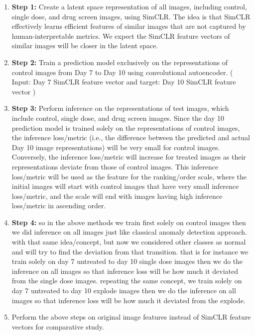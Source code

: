 \begin{enumerate}
    \item \textbf{Step 1:} Create a latent space representation of all images, including control, single dose, 
    and drug screen images, using SimCLR. 
    The idea is that SimCLR effectively learns efficient features of similar images that are not captured by 
    human-interpretable metrics. We expect the SimCLR feature vectors of similar images will be closer in the latent space. 
  
  \item \textbf{Step 2:} Train a prediction model exclusively on the representations of 
  control images from Day 7 to Day 10 using convolutional autoencoder. ( Input: Day 7 SimCLR feature vector and target: Day 10 SimCLR feature vector )

  
  \item \textbf{Step 3:} Perform inference on the representations of test images, which include control, single dose, and drug screen images.
  Since the day 10 prediction model is trained solely on the representations of control images, the inference loss/metric 
  (i.e., the difference between the predicted and actual Day 10 image representations) will be very small for control images.
   Conversely, the inference loss/metric will increase for treated images as their representations deviate from those of control images.
  This inference loss/metric will be used as the feature for the ranking/order scale, where the initial images will start 
  with control images that have very small inference loss/metric, and the scale will end with images having high inference loss/metric in ascending order. 
  
  \item \textbf{Step 4:} so in the above methods we train first solely on control images then we did inference on all images just like classical anomaly detection approach. 
  with that same idea/concept, but now we considered other classes as normal and will try to find the deviation from that transition. that is for instance we train solely on day 7 untreated to day 10 single dose images then we do the inference on all images so that inference loss will be how much it deviated from the single dose 
  images. repeating the same concept, we train solely on day 7 untreated to day 10 explode images then we do the inference on all images so that inference loss will be how much it deviated from the explode.
  \item Perform the above steps on original image features instead of SimCLR feature vectors for comparative study.
\end{enumerate}

